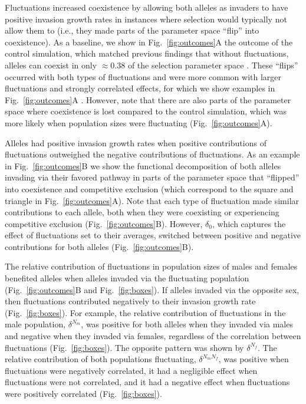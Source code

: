
Fluctuations increased coexistence by allowing both alleles as invaders to have positive invasion growth rates in instances where selection would typically not allow them to (i.e., they made parts of the parameter space ``flip'' into coexistence).  As a baseline, we show in Fig.~\ref{fig:outcomes}A the outcome of the control simulation, which matched previous findings that without fluctuations, alleles can coexist in only $\approx 0.38$ of the selection parameter space \citep{connallon2018environmental}. These ``flips'' occurred with both types of fluctuations and were more common with larger fluctuations and strongly correlated effects, for which we show examples in Fig.~\ref{fig:outcomes}A . However, note that there are also parts of the parameter space where coexistence is lost compared to the control simulation, which was more likely when population sizes were fluctuating (Fig.~\ref{fig:outcomes}A).

Alleles had positive invasion growth rates when positive contributions of fluctuations outweighed the negative contributions of fluctuations. As an example in Fig.~\ref{fig:outcomes}B we show the functional decomposition of both alleles invading via their favored pathway in parts of the parameter space that ``flipped'' into coexistence and competitive exclusion (which correspond to the square and triangle in Fig.~\ref{fig:outcomes}A). Note that each type of fluctuation made similar contributions to each allele, both when they were coexisting or experiencing competitive exclusion (Fig.~\ref{fig:outcomes}B). However, $\delta_{0}$, which captures the effect of fluctuations set to their averages, switched between positive and negative contributions for both alleles (Fig.~\ref{fig:outcomes}B).

The relative contribution of fluctuations in population sizes of males and females benefited alleles when alleles invaded via the fluctuating population (Fig.~\ref{fig:outcomes}B and Fig.~\ref{fig:boxes}). If alleles invaded via the opposite sex, then fluctuations contributed negatively to their invasion growth rate  (Fig.~\ref{fig:boxes}). For example, the relative contribution of fluctuations in the male population, $\delta^{N_{m}}$, was positive for both alleles when they invaded via males and negative when they invaded via females, regardless of the correlation between fluctuations (Fig.~\ref{fig:boxes}). The opposite pattern was shown by $\delta^{N_{f}}$. The relative contribution of both populations fluctuating,  $\delta^{N_{m}N_{f}}$, was positive when fluctuations were negatively correlated, it had a negligible effect when fluctuations were not correlated, and it had a negative effect when fluctuations were positively correlated (Fig.~\ref{fig:boxes}).

